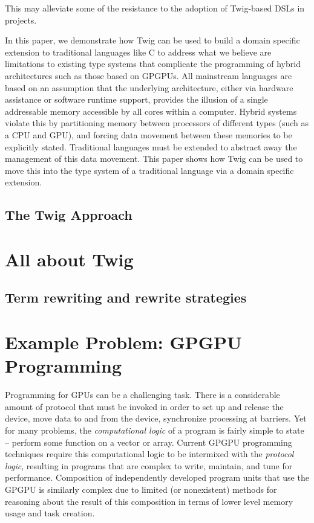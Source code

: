 \documentclass{acm_proc_article-sp}
\begin{document}
This may alleviate some of the resistance to the adoption of Twig-based DSLs
in projects.

In this paper, we demonstrate how Twig can be used to build a domain specific
extension to traditional languages like C to address what we believe are
limitations to existing type systems that complicate the programming of hybrid
architectures such as those based on GPGPUs. All mainstream languages are
based on an assumption that the underlying architecture, either via hardware
assistance or software runtime support, provides the illusion of a single
addressable memory accessible by all cores within a computer. Hybrid systems
violate this by partitioning memory between processors of different types
(such as a CPU and GPU), and forcing data movement between these memories to
be explicitly stated. Traditional languages must be extended to abstract away
the management of this data movement. This paper shows how Twig can be used to
move this into the type system of a traditional language via a domain specific
extension. %

\subsection{The Twig Approach}

\section{All about Twig}

\subsection{Term rewriting and rewrite strategies}

\section{Example Problem: GPGPU Programming}

Programming for GPUs can be a challenging task. There is a considerable amount
of protocol that must be invoked in order to set up and release the device,
move data to and from the device, synchronize processing at barriers. Yet for
many problems, the \emph{computational logic} of a program is fairly simple to
state -- perform some function on a vector or array. Current GPGPU programming
techniques require this computational logic to be intermixed with the
\emph{protocol logic}, resulting in programs that are complex to write,
maintain, and tune for performance. Composition of independently developed
program units that use the GPGPU is similarly complex due to limited (or
nonexistent) methods for reasoning about the result of this composition in
terms of lower level memory usage and task creation.
\end{document}

